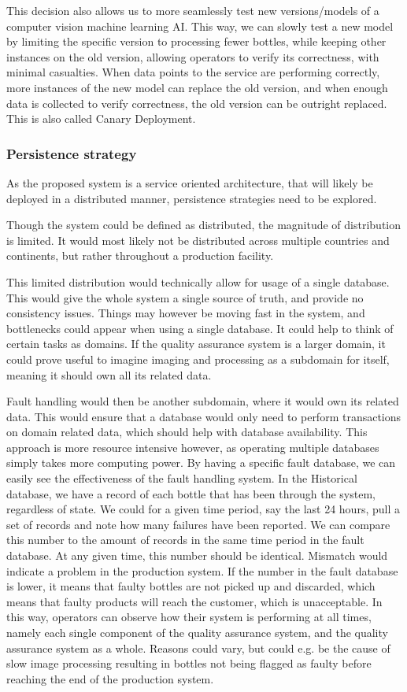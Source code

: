 This decision also allows us to more seamlessly test new versions/models of a computer vision machine learning AI. This way, we can slowly test a new model by limiting the specific version to processing fewer bottles, while keeping other instances on the old version, allowing operators to verify its correctness, with minimal casualties. When data points to the service are performing correctly, more instances of the new model can replace the old version, and when enough data is collected to verify correctness, the old version can be outright replaced. This is also called Canary Deployment\cite{strasser2023evaluation}.

\subsubsection{Persistence strategy}
As the proposed system is a service oriented architecture, that will likely be deployed in a distributed manner, persistence strategies need to be explored. 

Though the system could be defined as distributed, the magnitude of distribution is limited. It would most likely not be distributed across multiple countries and continents, but rather throughout a production facility. 

This limited distribution would technically allow for usage of a single database. This would give the whole system a single source of truth, and provide no consistency issues. Things may however be moving fast in the system, and bottlenecks could appear when using a single database. It could help to think of certain tasks as domains. If the quality assurance system is a larger domain, it could prove useful to imagine imaging and processing as a subdomain for itself, meaning it should own all its related data. 

Fault handling would then be another subdomain, where it would own its related data. This would ensure that a database would only need to perform transactions on domain related data, which should help with database availability. This approach is more resource intensive however, as operating multiple databases simply takes more computing power.
By having a specific fault database, we can easily see the effectiveness of the fault handling system. In the Historical database, we have a record of each bottle that has been through the system, regardless of state. We could for a given time period, say the last 24 hours, pull a set of records and note how many failures have been reported. We can compare this number to the amount of records in the same time period in the fault database. At any given time, this number should be identical. Mismatch would indicate a problem in the production system. If the number in the fault database is lower, it means that faulty bottles are not picked up and discarded, which means that faulty products will reach the customer, which is unacceptable. In this way, operators can observe how their system is performing at all times, namely each single component of the quality assurance system, and the quality assurance system as a whole. Reasons could vary, but could e.g. be the cause of slow image processing resulting in bottles not being flagged as faulty before reaching the end of the production system.

